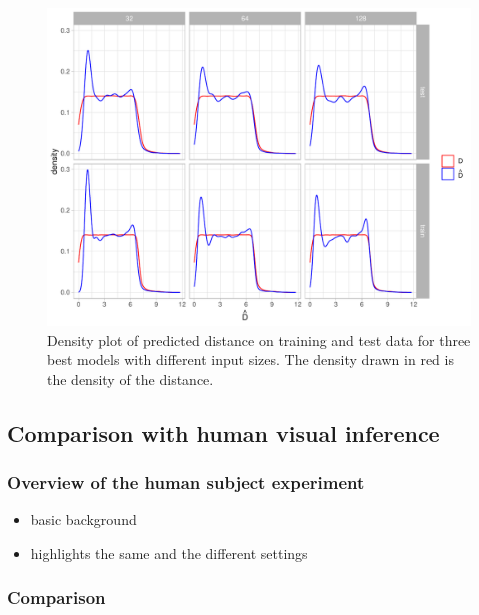 \documentclass[]{interact}
\theoremstyle{plain}%
\theoremstyle{definition}
\theoremstyle{remark}
\providecommand{\tightlist}{%
  \setlength{\itemsep}{0pt}\setlength{\parskip}{0pt}}
\def\tightlist{}
\begin{document}
\begin{figure}

{\centering \includegraphics[width=1\linewidth]{paper_files/figure-latex/model-performance-density-1} 

}

\caption{Density plot of predicted distance on training and test data for three best models with different input sizes. The density drawn in red is the density of the distance.}\label{fig:model-performance-density}
\end{figure}

\hypertarget{comparison-with-human-visual-inference}{%
\subsection{Comparison with human visual
inference}\label{comparison-with-human-visual-inference}}

\hypertarget{overview-of-the-human-subject-experiment}{%
\subsubsection{Overview of the human subject
experiment}\label{overview-of-the-human-subject-experiment}}

\begin{itemize}
\tightlist
\item
  basic background
\item
  highlights the same and the different settings
\end{itemize}

\hypertarget{comparison}{%
\subsubsection{Comparison}\label{comparison}}
\end{document}
